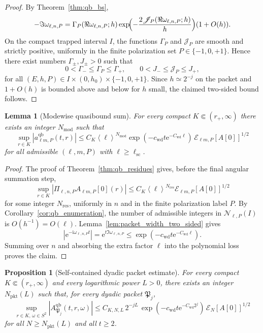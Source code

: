 \documentclass[12pt]{article}
\numberwithin{equation}{section}
\theoremstyle{plain}
\newtheorem{proposition}[theorem]{Proposition}
\newtheorem{lemma}[theorem]{Lemma}
\theoremstyle{definition}
\theoremstyle{remark}
\newcommand{\ii}{\mathrm i}
\newcommand{\ee}{\mathrm e}
\newcommand{\qb}{\mathrm{qb}}
\newcommand{\angles}[1]{\left\langle #1 \right\rangle}
\newcommand{\abs}[1]{\left|#1\right|}
\begin{document}
\begin{proof}
By Theorem~\ref{thm:qb_bs},
\[
   -\Im\omega_{\ell,n,P}
   =
   \Gamma_P(\Re\omega_{\ell,n,P};h)
   \exp\!\Bigl(-\frac{2\mathscr J_P(\Re\omega_{\ell,n,P};h)}{h}\Bigr)
   (1+O(h)).
\]
On the compact trapped interval $I$, the functions $\Gamma_P$ and $\mathscr J_P$ are smooth and strictly positive, uniformly in the finite polarization set $P\in\{-1,0,+1\}$.  Hence there exist numbers $\Gamma_\pm,J_\pm>0$ such that
\[
   0<\Gamma_-\le \Gamma_P\le \Gamma_+,
   \qquad
   0<J_-\le \mathscr J_P\le J_+,
\]
for all $(E,h,P)\in I\times(0,h_0)\times\{-1,0,+1\}$.  Since $h\simeq2^{-j}$ on the packet and $1+O(h)$ is bounded above and below for $h$ small, the claimed two-sided bound follows.
\end{proof}

\begin{lemma}[Modewise quasibound sum]\label{lem:packet_modewise}
For every compact $K\Subset(r_+,\infty)$ there exists an integer $N_{\mathrm{mod}}$ such that
\[
   \sup_{r\in K}\abs{a^{\qb}_{\ell m,P}(t,r)}
   \le
   C_K \angles{\ell}^{N_{\mathrm{mod}}}\exp(-c_{\mathrm{wd}}t\ee^{-C_{\mathrm{wd}}\ell})\,\mathcal E_{\ell m,P}[A[0]]^{1/2}
\]
for all admissible $(\ell,m,P)$ with $\ell\ge \ell_{\mathrm{sc}}$.
\end{lemma}

\begin{proof}
The proof of Theorem~\ref{thm:qb_residues} gives, before the final angular summation step,
\[
   \sup_{r\in K}\abs{\Pi_{\ell,n,P}A_{\ell m,P}[0](r)}
   \le
   C_K\angles{\ell}^{N_{\mathrm{res}}}\mathcal E_{\ell m,P}[A[0]]^{1/2}
\]
for some integer $N_{\mathrm{res}}$, uniformly in $n$ and in the finite polarization label $P$.  By Corollary~\ref{cor:qb_enumeration}, the number of admissible integers in $\mathcal N_{\ell,P}(I)$ is $O(h^{-1})=O(\ell)$.  Lemma~\ref{lem:packet_width_two_sided} gives
\[
   \abs{\ee^{-\ii\omega_{\ell,n,P}t}}
   =
   \ee^{t\Im\omega_{\ell,n,P}}
   \le
   \exp(-c_{\mathrm{wd}}t\ee^{-C_{\mathrm{wd}}\ell}).
\]
Summing over $n$ and absorbing the extra factor $\ell$ into the polynomial loss proves the claim.
\end{proof}

\begin{proposition}[Self-contained dyadic packet estimate]\label{prop:packet_estimate}
For every compact $K\Subset(r_+,\infty)$ and every logarithmic power $L>0$, there exists an integer $N_{\mathrm{pkt}}(L)$ such that, for every dyadic packet $\mathfrak P_j$,
\[
   \sup_{r\in K,\,\omega\in S^2}\abs{A^{\qb}_{\mathfrak P_j}(t,r,\omega)}
   \le
   C_{K,N,L}\,2^{-jL}\,\exp(-c_{\mathrm{wd}}t\ee^{-C_{\mathrm{wd}}2^j})\,\mathcal E_N[A[0]]^{1/2}
\]
for all $N\ge N_{\mathrm{pkt}}(L)$ and all $t\ge2$.
\end{proposition}
\end{document}
